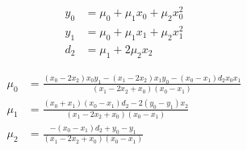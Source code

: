 \begin{align}
  y_0 & = \mu_0+\mu_1 x_0+\mu_2 x_0^{2}  \\
   y_1 & = \mu_0+\mu_1 x_1+\mu_2 x_1^{2}  \\
   d_2 & = \mu_1+2 \mu_2 x_2  
\end{align}

 
\begin{align}
  \mu_0 & = \frac
{ \left( x_0 - 2 x_2 \right)  x_0 y_1 -  \left( x_1 - 2 x_2 \right)  x_1 y_0 -  \left( x_0 -  x_1 \right)  d_2 x_0 x_1}
{ \left( x_1 - 2 x_2+x_0 \right)   \left( x_0 - x_1  \right) } \\
   \mu_1 & = \frac
{ \left( x_0+x_1 \right)   \left( x_0 - x_1 \right)  d_2 - 2   \left( y_0 - y_1 \right)  x_2}
{ \left( x_1 - 2 x_2+x_0 \right)   \left( x_0 - x_1  \right) } \\
   \mu_2 & = \frac
{ -  \left( x_0 - x_1 \right)  d_2+y_0 - y_1}
{  \left( x_1 - 2 x_2+x_0 \right)   \left( x_0 - x_1 \right) } 
\end{align}
